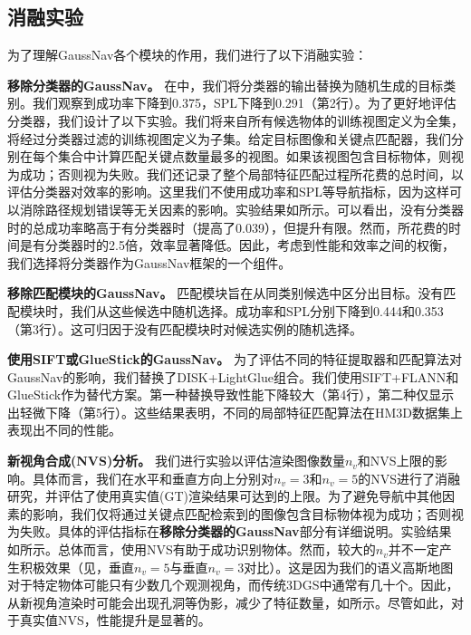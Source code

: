 





\subsection{消融实验}

为了理解GaussNav各个模块的作用，我们进行了以下消融实验：

\textbf{移除分类器的GaussNav。} 在中，我们将分类器的输出替换为随机生成的目标类别。我们观察到成功率下降到0.375，SPL下降到0.291（第2行）。为了更好地评估分类器，我们设计了以下实验。我们将来自所有候选物体的训练视图定义为全集，将经过分类器过滤的训练视图定义为子集。给定目标图像和关键点匹配器，我们分别在每个集合中计算匹配关键点数量最多的视图。如果该视图包含目标物体，则视为成功；否则视为失败。我们还记录了整个局部特征匹配过程所花费的总时间，以评估分类器对效率的影响。这里我们不使用成功率和SPL等导航指标，因为这样可以消除路径规划错误等无关因素的影响。实验结果如所示。可以看出，没有分类器时的总成功率略高于有分类器时（提高了0.039），但提升有限。然而，所花费的时间是有分类器时的2.5倍，效率显著降低。因此，考虑到性能和效率之间的权衡，我们选择将分类器作为GaussNav框架的一个组件。



\textbf{移除匹配模块的GaussNav。} 匹配模块旨在从同类别候选中区分出目标。没有匹配模块时，我们从这些候选中随机选择。成功率和SPL分别下降到0.444和0.353（第3行）。这可归因于没有匹配模块时对候选实例的随机选择。

\textbf{使用SIFT或GlueStick的GaussNav。} 为了评估不同的特征提取器和匹配算法对GaussNav的影响，我们替换了DISK\cite{tyszkiewicz2020disk}+LightGlue\cite{lindenberger2023lightglue}组合。我们使用SIFT+FLANN和GlueStick\cite{pautrat_suarez_2023_gluestick}作为替代方案。第一种替换导致性能下降较大（第4行），第二种仅显示出轻微下降（第5行）。这些结果表明，不同的局部特征匹配算法在HM3D数据集上表现出不同的性能。

\textbf{新视角合成(NVS)分析。} 我们进行实验以评估渲染图像数量$n_v$和NVS上限的影响。具体而言，我们在水平和垂直方向上分别对$n_v=3$和$n_v=5$的NVS进行了消融研究，并评估了使用真实值(GT)渲染结果可达到的上限。为了避免导航中其他因素的影响，我们仅将通过关键点匹配检索到的图像包含目标物体视为成功；否则视为失败。具体的评估指标在\textbf{移除分类器的GaussNav}部分有详细说明。实验结果如所示。总体而言，使用NVS有助于成功识别物体。然而，较大的$n_v$并不一定产生积极效果（见，垂直$n_v=5$与垂直$n_v=3$对比）。这是因为我们的语义高斯地图对于特定物体可能只有少数几个观测视角，而传统3DGS中通常有几十个。因此，从新视角渲染时可能会出现孔洞等伪影，减少了特征数量，如所示。尽管如此，对于真实值NVS，性能提升是显著的。


